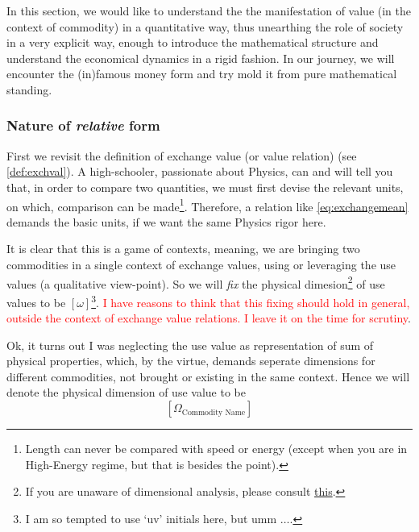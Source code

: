 \documentclass[12pt]{extarticle}
\theoremstyle{definition}
\begin{document}
In this section, we would like to understand the the manifestation of value (in the context of commodity) in a quantitative way, thus unearthing the role of society in a very explicit way, enough to introduce the mathematical structure and understand the economical dynamics in a rigid fashion.  In our journey, we will encounter the (in)famous money form and try mold it from pure mathematical standing.

\subsubsection{Nature of \emph{relative} form}
First we revisit the definition of exchange value (or value relation) (see \ref{def:exchval}).  A high-schooler, passionate about Physics, can and will tell you that, in order to compare two quantities, we must first devise the relevant units, on which, comparison can be made\footnote{Length can never be compared with speed or energy (except when you are in High-Energy regime, but that is besides the point).}.  Therefore, a relation like \ref{eq:exchangemean} demands the basic units, if we want the same Physics rigor here.

It is clear that this is a game of contexts, meaning, we are bringing two commodities in a single context of exchange values, using or leveraging the use values (a qualitative view-point).  So we will \emph{fix} the physical dimesion\footnote{If you are unaware of dimensional analysis, please consult \href{https://en.wikipedia.org/wiki/Dimensional_analysis}{this}.} of use values to be $[\omega]$\footnote{I am so tempted to use `uv' initials here, but umm $\ldots$.}.  \textcolor{red}{I have reasons to think that this fixing should hold in general, outside the context of exchange value relations.  I leave it on the time for scrutiny}.

Ok, it turns out I was neglecting the use value as representation of sum of physical properties, which, by the virtue, demands seperate dimensions for different commodities, not brought or existing in the same context.  Hence we will denote the physical dimension of use value to be
\begin{equation}
  \label{eq:usevaldim}
  \left[\Omega_{\text{Commodity Name}}\right]
\end{equation}
\end{document}
